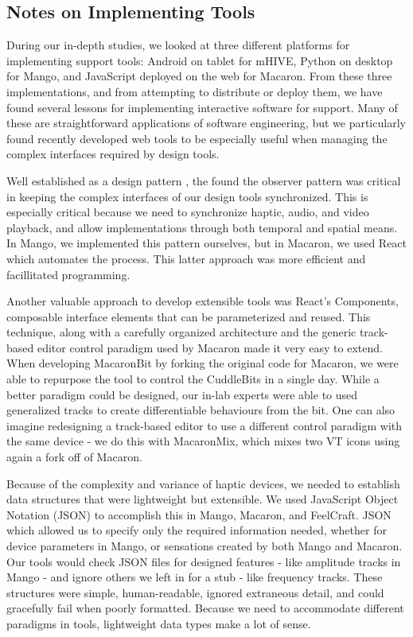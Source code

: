 %
%
\subsection{Notes on Implementing \haxd Tools}
During our in-depth studies, we looked at three different platforms for implementing \haxd support tools: Android on tablet for mHIVE, Python on desktop for Mango, and JavaScript deployed on the web for Macaron.
From these three implementations, and from attempting to distribute or deploy them, we have found several lessons for implementing interactive software for \haxd support.
Many of these are straightforward applications of software engineering, but we particularly found recently developed web tools to be especially useful when managing the complex interfaces required by design tools.

Well established as a design pattern \cite{}, the found the observer pattern was critical in keeping the complex interfaces of our design tools synchronized.
This is especially critical because we need to synchronize haptic, audio, and video playback, and allow implementations through both temporal and spatial means.
In Mango, we implemented this pattern ourselves, but in Macaron, we used React \cite{} which automates the process.
This latter approach was more efficient and facillitated programming.

Another valuable approach to develop extensible tools was React's Components, composable interface elements that can be parameterized and reused.
This technique, along with a carefully organized architecture and the generic track-based editor control paradigm used by Macaron made it very easy to extend.
When developing MacaronBit by forking the original code for Macaron, we were able to repurpose the tool to control the CuddleBits in a single day.
While a better paradigm could be designed, our in-lab experts were able to used generalized tracks to create differentiable behaviours from the bit.
One can also imagine redesigning a track-based editor to use a different control paradigm with the same device - we do this with MacaronMix, which mixes two VT icons using again a fork off of Macaron.


Because of the complexity and variance of haptic devices, we needed to establish data structures that were lightweight but extensible.
We used JavaScript Object Notation (JSON) to accomplish this in Mango, Macaron, and FeelCraft.
JSON which allowed us to specify only the required information needed, whether for device parameters in Mango, or sensations created by both Mango and Macaron.
Our tools would check JSON files for designed features - like amplitude tracks in Mango - and ignore others we left in for a stub - like frequency tracks.
These structures were simple, human-readable, ignored extraneous detail, and could gracefully fail when poorly formatted.
Because we need to accommodate different paradigms in \haxd tools, lightweight data types make a lot of sense.

